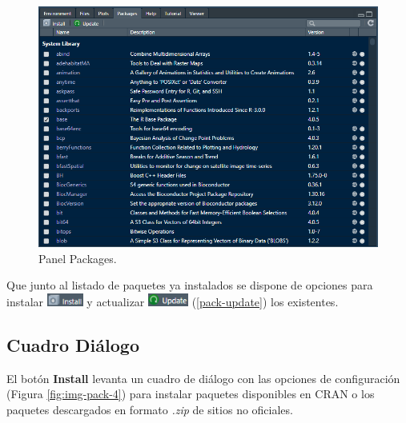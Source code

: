 \documentclass[
]{book}
\begin{document}
\begin{figure}

{\centering \includegraphics[width=10.58in]{img/pack1} 

}

\caption{Panel Packages.}\label{fig:img-pack-1}
\end{figure}

Que junto al listado de paquetes ya instalados se dispone de opciones para instalar \includegraphics[width=0.46875in,height=\textheight]{img/pack4.png} y actualizar \includegraphics[width=0.52083in,height=\textheight]{img/pack5.png} (\ref{pack-update}) los existentes.

\hypertarget{pack-cuadro}{%
\subsection{Cuadro Diálogo}\label{pack-cuadro}}

El botón \textbf{Install} levanta un cuadro de diálogo con las opciones de configuración (Figura \ref{fig:img-pack-4}) para instalar paquetes disponibles en CRAN o los paquetes descargados en formato \emph{.zip} de sitios no oficiales.
\end{document}
